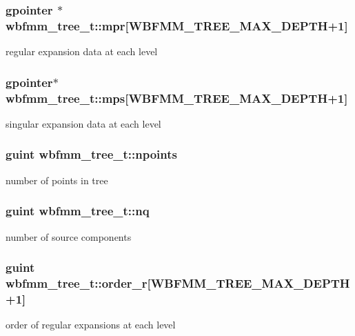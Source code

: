 \subsubsection[{mpr}]{\setlength{\rightskip}{0pt plus 5cm}gpointer $\ast$ wbfmm\+\_\+tree\+\_\+t\+::mpr[W\+B\+F\+M\+M\+\_\+\+T\+R\+E\+E\+\_\+\+M\+A\+X\+\_\+\+D\+E\+P\+T\+H+1]}\label{structwbfmm__tree__t_ac47b0aef61e58e198fa06d40e0eff738}
regular expansion data at each level 
\subsubsection[{mps}]{\setlength{\rightskip}{0pt plus 5cm}gpointer$\ast$ wbfmm\+\_\+tree\+\_\+t\+::mps[W\+B\+F\+M\+M\+\_\+\+T\+R\+E\+E\+\_\+\+M\+A\+X\+\_\+\+D\+E\+P\+T\+H+1]}\label{structwbfmm__tree__t_aaa852afe822a466d84b51c3fb53b5e7b}
singular expansion data at each level 
\subsubsection[{npoints}]{\setlength{\rightskip}{0pt plus 5cm}guint wbfmm\+\_\+tree\+\_\+t\+::npoints}\label{structwbfmm__tree__t_a05dd3977f0f6f9266dfe5b4de1fd94ea}
number of points in tree 
\subsubsection[{nq}]{\setlength{\rightskip}{0pt plus 5cm}guint wbfmm\+\_\+tree\+\_\+t\+::nq}\label{structwbfmm__tree__t_a4201af7a54bb9d81e588ab619cecabbd}
number of source components 
\subsubsection[{order\+\_\+r}]{\setlength{\rightskip}{0pt plus 5cm}guint wbfmm\+\_\+tree\+\_\+t\+::order\+\_\+r[W\+B\+F\+M\+M\+\_\+\+T\+R\+E\+E\+\_\+\+M\+A\+X\+\_\+\+D\+E\+P\+T\+H+1]}\label{structwbfmm__tree__t_a3977c9974da5fbeaa66a9b1eea6fd235}
order of regular expansions at each level 

